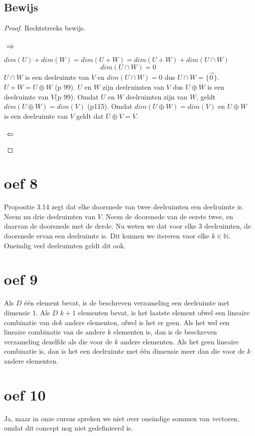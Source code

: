 \documentclass[lineaire_algebra_oplossingen.tex]{subfiles}
\begin{document}
\subsection*{Bewijs}
\begin{proof}
Rechtstreeks bewijs.
\subsubsection*{$\Rightarrow$}
$dim(U) + dim(W) = dim(U+W)= dim(U+W) + dim(U\cap W)$
\[
dim(U\cap W) = 0
\]
$U \cap W$ is een deelruimte van $V$ en $dim(U\cap W) = 0$ dus $U \cap W = \{\vec{0}\}$.
$U+W = U\oplus W$ (p 99). $U$ en $W$ zijn deelruimten van $V$ dus $U\oplus W$ is een deelruimte van $V$(p 99). Omdat $U$ en $W$ deelruimten zijn van $W$, geldt $dim(U \oplus W) = dim(V)$ (p115). Omdat $dim(U \oplus W) = dim(V)$ en $U \oplus W$ is een deelruimte van $V$ geldt dat $U \oplus V = V$.
\subsubsection*{$\Leftarrow$}
\end{proof}

\section{oef 8}
Propositie 3.14 zegt dat elke doorsnede van twee deelruimten een deelruimte is. Neem nu drie deelruimten van $V$. Neem de doorsnede van de eerste twee, en daarvan de doorsnede met de derde. Nu weten we dat voor elke $3$ deelruimten, de doorsnede ervan een deelruimte is. Dit kunnen we itereren voor elke $k \in \mathbb{N}$. Oneindig veel deelruimten geldt dit ook.

\section{oef 9}
Als $D$ één element bevat, is de beschreven verzameling een deelruimte met dimensie $1$. Als $D$ $k+1$ elementen bevat, is het laatste element ofwel een lineaire combinatie van de$k$ andere elementen, ofwel is het er geen. Als het wel een lineaire combinatie van de andere $k$ elementen is, dan is de beschreven verzameling dezelfde als die voor de $k$ andere elementen. Als het geen lineaire combinatie is, dan is het een deelruimte met één dimensie meer dan die voor de $k$ andere elementen.

\section{oef 10}
Ja, maar in onze cursus spreken we niet over oneindige sommen van vectoren, omdat dit concept nog niet gedefinieerd is.
\end{document}
